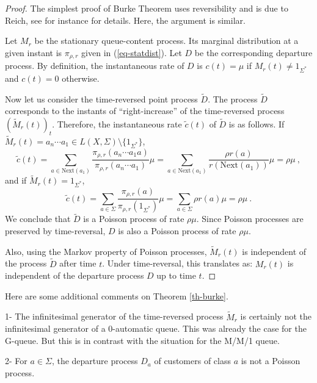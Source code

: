 \documentclass[11pt,a4paper]{article}
\theoremstyle{remark}
\newcommand{\moins}{ {\setminus} }
\def\rig{\text{Next}}
\def\eref#1{(\ref{#1})}
\begin{document}
\begin{proof}
The simplest proof of Burke Theorem uses reversibility and is due to
Reich, see for instance \cite{kell79} for details. Here, the argument
is similar.

Let $M_r$ be the stationary queue-content process. Its marginal
distribution at a given instant is $\pi_{\rho,r}$ given in
\eref{eq-statdist}. Let $D$ be the corresponding departure
process. By definition, the instantaneous rate of $D$ is
$c(t)=\mu$ if $M_r(t)\neq 1_{\Sigma^*}$ and $c(t)=0$ otherwise.

Now let us consider the time-reversed point process
$\widetilde{D}$. The process $\widetilde{D}$ corresponds to the
instants of ``right-increase'' of the time-reversed process
$(\widetilde{M}_r(t))_t$. Therefore, the instantaneous rate
$\tilde{c}(t)$ of $\widetilde{D}$ is as follows.
If $\widetilde{M}_r(t)=a_n\cdots a_1 \in L(X,\Sigma) \moins \{1_{\Sigma^*}\}$,
\begin{equation}\label{eq-burke}
\tilde{c}(t) = \sum_{a\in \rig(a_1)} \frac{\pi_{\rho,r}(a_n\cdots a_1
  a)}{\pi_{\rho,r}(a_n\cdots a_1)} \mu = \sum_{a\in \rig(a_1)}
  \frac{\rho r(a)}{r(\rig(a_1))} \mu =\rho \mu \:,
\end{equation}
and if $\widetilde{M}_r(t)=1_{\Sigma^*}$,
\[
\tilde{c}(t) = \sum_{a\in \Sigma} \frac{
  \pi_{\rho,r}(a)}{\pi_{\rho,r}(1_{\Sigma^*})} \mu = \sum_{a\in \Sigma} \rho
  r(a) \mu = \rho \mu \:.
\]
We conclude that $\widetilde{D}$ is a Poisson process of rate
$\rho\mu$. Since Poisson processes are preserved by time-reversal, $D$
is also a Poisson process of rate $\rho\mu$.

Also, using the Markov property of Poisson processes,
$\widetilde{M}_r(t)$ is independent of the process $\widetilde{D}$
after time $t$. Under time-reversal, this translates as: $M_r(t)$ is
independent of the departure process $D$ up to time $t$.
\end{proof}




Here are some additional comments on Theorem \ref{th-burke}.

\medskip

1- The infinitesimal generator of the time-reversed process
$\widetilde{M}_r$ is certainly not the infinitesimal generator of
a 0-automatic queue. This was already the case for the G-queue. But
this is in contrast with the situation for the M/M/1 queue. 

\medskip


2- For $a\in \Sigma$, the departure process $D_a$ of
customers of class $a$ is not a Poisson process.
\end{document}
